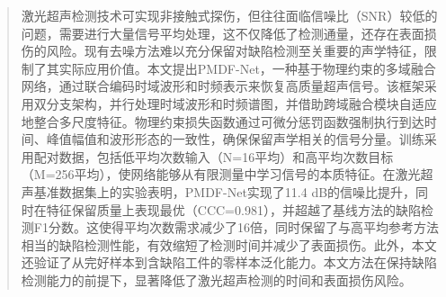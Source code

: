 \begin{abstract}
激光超声检测技术可实现非接触式探伤，但往往面临信噪比（SNR）较低的问题，需要进行大量信号平均处理，这不仅降低了检测通量，还存在表面损伤的风险。现有去噪方法难以充分保留对缺陷检测至关重要的声学特征，限制了其实际应用价值。本文提出PMDF-Net，一种基于物理约束的多域融合网络，通过联合编码时域波形和时频表示来恢复高质量超声信号。该框架采用双分支架构，并行处理时域波形和时频谱图，并借助跨域融合模块自适应地整合多尺度特征。物理约束损失函数通过可微分惩罚函数强制执行到达时间、峰值幅值和波形形态的一致性，确保保留声学相关的信号分量。训练采用配对数据，包括低平均次数输入（N=16平均）和高平均次数目标（M=256平均），使网络能够从有限测量中学习信号的本质特征。在激光超声基准数据集上的实验表明，PMDF-Net实现了11.4 dB的信噪比提升，同时在特征保留质量上表现最优（CCC=0.981），并超越了基线方法的缺陷检测F1分数。这使得平均次数需求减少了16倍，同时保留了与高平均参考方法相当的缺陷检测性能，有效缩短了检测时间并减少了表面损伤。此外，本文还验证了从完好样本到含缺陷工件的零样本泛化能力。本文方法在保持缺陷检测能力的前提下，显著降低了激光超声检测的时间和表面损伤风险。
\end{abstract}